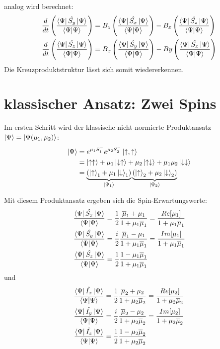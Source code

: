 analog wird berechnet:
\begin{align}
    \frac{d}{dt}\left(\frac{\bra{\Psi}\hat{S_y}\ket{\Psi}}{\bra{\Psi}\ket{\Psi}}\right) &= B_z\left(\frac{\bra{\Psi}\hat{S_x}\ket{\Psi}}{\bra{\Psi}\ket{\Psi}}\right) - B_x\left(\frac{\bra{\Psi}\hat{S_z}\ket{\Psi}}{\bra{\Psi}\ket{\Psi}}\right)\\
    \frac{d}{dt}\left(\frac{\bra{\Psi}\hat{S_z}\ket{\Psi}}{\bra{\Psi}\ket{\Psi}}\right) &= B_x\left(\frac{\bra{\Psi}\hat{S_y}\ket{\Psi}}{\bra{\Psi}\ket{\Psi}}\right) - By\left(\frac{\bra{\Psi}\hat{S_x}\ket{\Psi}}{\bra{\Psi}\ket{\Psi}}\right)
\end{align}
Die Kreuzproduktstruktur lässt sich somit wiedererkennen.





















\section{klassischer Ansatz: Zwei Spins}
\noindent Im ersten Schritt wird der klassische nicht-normierte Produktansatz $\ket{\Psi} = \ket{\Psi(\mu_1, \mu_2)}$: 
\begin{align}
    \ket{\Psi} &= e^{\mu_1 S_{1}^{-}}e^{\mu_2 S_{2}^{-}}\ket{\uparrow,\uparrow}\\
                &= \ket{\uparrow \uparrow} +\mu_1\ket{\downarrow \uparrow} + \mu_2\ket{\uparrow \downarrow} + \mu_1\mu_2\ket{\downarrow\downarrow}\\
                &= \underbrace{\left(\ket{\uparrow}_1 + \mu_1\ket{\downarrow}_1\right)}_{\ket{\Psi_1}}\underbrace{\left(\ket{\uparrow}_2 + \mu_2\ket{\downarrow}_2\right)}_{\ket{\Psi_2}}  \\
\end{align}

Mit diesem Produktansatz ergeben sich die Spin-Erwartungswerte:
\begin{align}
    \frac{\bra{\Psi}\hat{S_x}\ket{\Psi}}{\bra{\Psi}\ket{\Psi}} &= \frac{1}{2}\frac{\overline{\mu}_1 + \mu_1}{1+\mu_1\overline{\mu}_1} = \frac{Re[\mu_1]}{1 + \mu_1\overline{\mu}_1} \\
    \frac{\bra{\Psi}\hat{S_y}\ket{\Psi}}{\bra{\Psi}\ket{\Psi}} &= \frac{i}{2}\frac{\overline{\mu}_1 - \mu_1}{1+\mu_1\overline{\mu}_1} = \frac{Im[\mu_1]}{1 + \mu_1\overline{\mu}_1} \\
    \frac{\bra{\Psi}\hat{S_z}\ket{\Psi}}{\bra{\Psi}\ket{\Psi}} &= \frac{1}{2}\frac{1 - \mu_1\overline{\mu}_1}{1 + \mu_1\overline{\mu}_1}  
\end{align}
und 
\begin{align}
    \frac{\bra{\Psi}\hat{I_x}\ket{\Psi}}{\bra{\Psi}\ket{\Psi}} &= \frac{1}{2}\frac{\overline{\mu}_2 + \mu_2}{1+\mu_2\overline{\mu}_2} = \frac{Re[\mu_2]}{1 + \mu_2\overline{\mu}_2} \\
    \frac{\bra{\Psi}\hat{I_y}\ket{\Psi}}{\bra{\Psi}\ket{\Psi}} &= \frac{i}{2}\frac{\overline{\mu}_2 - \mu_2}{1+\mu_2\overline{\mu}_2} = \frac{Im[\mu_2]}{1 + \mu_2\overline{\mu}_2} \\
    \frac{\bra{\Psi}\hat{I_z}\ket{\Psi}}{\bra{\Psi}\ket{\Psi}} &= \frac{1}{2}\frac{1 - \mu_2\overline{\mu}_2}{1 + \mu_2\overline{\mu}_2}
\end{align}



